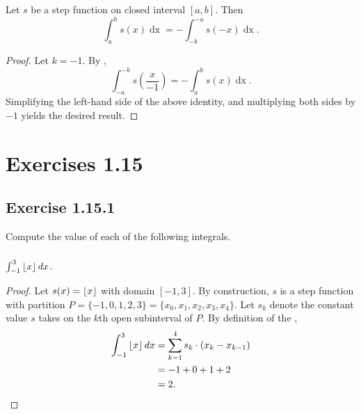 \documentclass{report}
\begin{document}
\section{}%
\label{sec:step-reflection-property}

Let $s$ be a step function on closed interval $[a, b]$.
Then
  $$\int_a^b s(x) \mathop{dx} = -\int_{-b}^{-a} s(-x) \mathop{dx}.$$

\begin{proof}

  Let $k = -1$.
  By ,
    $$\int_{-a}^{-b} s \left( \frac{x}{-1} \right) =
      -\int_a^b s(x) \mathop{dx}.$$
  Simplifying the left-hand side of the above identity, and multiplying both
    sides by $-1$ yields the desired result.

\end{proof}

\chapter{Exercises 1.15}%
\label{chap:exercises-1.15}

\section{Exercise 1.15.1}%
\label{sec:exercise-1.15.1}

Compute the value of each of the following integrals.

\subsection{}%
\label{sub:exercise-1.15.1a}

$\int_{-1}^3 \left\lfloor x\right\rfloor \mathop{dx}$.

\begin{proof}

  Let $s(x) = \left\lfloor x\right\rfloor$ with domain $[-1, 3]$.
  By construction, $s$ is a step function with partition
    $P = \{-1, 0, 1, 2, 3\} = \{x_0, x_1, x_2, x_3, x_4\}$.
  Let $s_k$ denote the constant value $s$ takes on the $k$th open subinterval of
    $P$.
  By definition of the ,
    \begin{align*}
      \int_{-1}^3 \left\lfloor x\right\rfloor \mathop{dx}
        & = \sum_{k=1}^4 s_k \cdot (x_k - x_{k-1}) \\
        & = -1 + 0 + 1 + 2 \\
        & = 2.
    \end{align*}

\end{proof}
\end{document}
